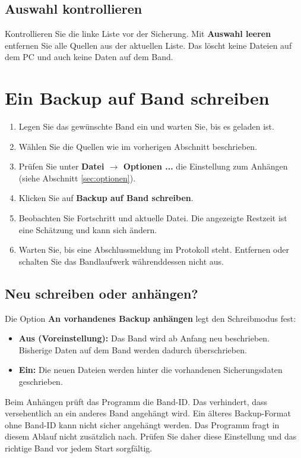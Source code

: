 \documentclass[11pt,a4paper]{article}
\begin{document}
\subsection{Auswahl kontrollieren}
Kontrollieren Sie die linke Liste vor der Sicherung. Mit \textbf{Auswahl leeren} entfernen Sie alle Quellen aus der aktuellen Liste. Das löscht keine Dateien auf dem PC und auch keine Daten auf dem Band.

\section{Ein Backup auf Band schreiben}
\begin{enumerate}
\item Legen Sie das gewünschte Band ein und warten Sie, bis es geladen ist.
\item Wählen Sie die Quellen wie im vorherigen Abschnitt beschrieben.
\item Prüfen Sie unter \textbf{Datei $\rightarrow$ Optionen ...} die Einstellung zum Anhängen (siehe Abschnitt \ref{sec:optionen}).
\item Klicken Sie auf \textbf{Backup auf Band schreiben}.
\item Beobachten Sie Fortschritt und aktuelle Datei. Die angezeigte Restzeit ist eine Schätzung und kann sich ändern.
\item Warten Sie, bis eine Abschlussmeldung im Protokoll steht. Entfernen oder schalten Sie das Bandlaufwerk währenddessen nicht aus.
\end{enumerate}

\subsection{Neu schreiben oder anhängen?}
Die Option \textbf{An vorhandenes Backup anhängen} legt den Schreibmodus fest:
\begin{itemize}
\item \textbf{Aus (Voreinstellung):} Das Band wird ab Anfang neu beschrieben. Bisherige Daten auf dem Band werden dadurch überschrieben.
\item \textbf{Ein:} Die neuen Dateien werden hinter die vorhandenen Sicherungsdaten geschrieben.
\end{itemize}
Beim Anhängen prüft das Programm die Band-ID. Das verhindert, dass versehentlich an ein anderes Band angehängt wird. Ein älteres Backup-Format ohne Band-ID kann nicht sicher angehängt werden. Das Programm fragt in diesem Ablauf nicht zusätzlich nach. Prüfen Sie daher diese Einstellung und das richtige Band vor jedem Start sorgfältig.
\end{document}
